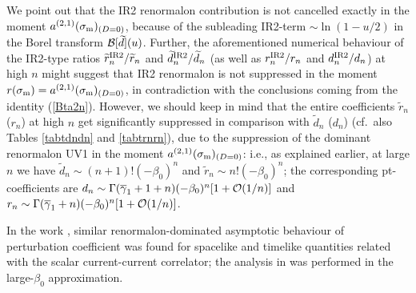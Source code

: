\documentclass[aps,nofootinbib,showkeys,noshowpacs,preprintnumbers,amsmath,amssymb]{revtex4}
\newcommand{\sm}{{\sigma_{\rm m}}}
\newcommand{\td}{{\widetilde d}}
\newcommand{\tr}{{\widetilde r}}
\newcommand{\bg}{{\overline {\gamma}}}
\begin{document}
We point out that the IR2 renormalon contribution is not cancelled exactly in the moment $a^{(2,1)}(\sm)_{(D=0)}$, because of the subleading IR2-term $\sim \ln(1 - u/2)$ in the Borel transform ${\cal B}[\td](u)$. Further, the aforementioned numerical behaviour of the IR2-type ratios $\tr_n^{\rm IR2}/\tr_n$ and $\td_n^{\rm IR2}/\td_n$ (as well as  $r_n^{\rm IR2}/r_n$ and $d_n^{\rm IR2}/d_n$) at high $n$ might suggest that IR2 renormalon is not suppressed in the moment $r(\sm) = a^{(2,1)}(\sm)_{(D=0)}$, in contradiction with the conclusions coming from the identity (\ref{Bta2n}). However, we should keep in mind that the entire coefficients $\tr_n$ ($r_n$) at high $n$ get significantly suppressed in comparison with $\td_n$ ($d_n$) (cf.~also Tables \ref{tabtdndn} and \ref{tabtrnrn}), due to the suppression of the dominant renormalon UV1 in the moment $a^{(2,1)}(\sm)_{(D=0)}$: i.e., as explained earlier, at large $n$ we have $\td_n \sim (n+1)! (-\beta_0)^n$ and $\tr_n \sim n! (-\beta_0)^n$; the corresponding pt-coefficients are $d_n \sim \Gamma(\bg_1 + 1 +n) (-\beta_0)^n [1 + {\cal O}(1/n)]$ and $r_n \sim \Gamma(\bg_1 +n) (-\beta_0)^n [1 + {\cal O}(1/n)]$.

In the work \cite{BKM}, similar renormalon-dominated asymptotic behaviour of perturbation coefficient was found for spacelike and timelike quantities related with the scalar current-current correlator; the analysis in \cite{BKM} was performed in the large-$\beta_0$ approximation.
\end{document}
